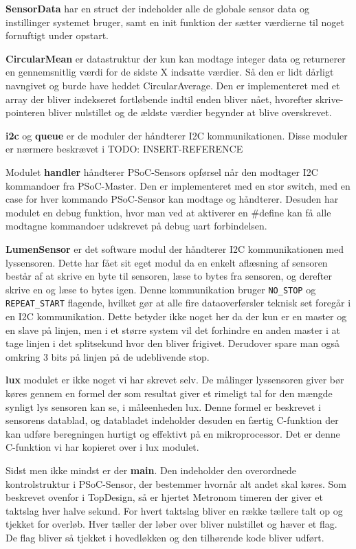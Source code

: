 \textbf{SensorData} har en struct der indeholder alle de globale sensor data og instillinger systemet bruger, samt en init funktion der sætter værdierne til noget fornuftigt under opstart.

\textbf{CircularMean} er datastruktur der kun kan modtage integer data og returnerer en gennemsnitlig værdi for de sidste X indsatte værdier. Så den er lidt dårligt navngivet og burde have heddet CircularAverage. Den er implementeret med et array der bliver indekseret fortløbende indtil enden bliver nået, hvorefter skrive-pointeren bliver nulstillet og de ældste værdier begynder at blive overskrevet.

\textbf{i2c} og \textbf{queue} er de moduler der håndterer I2C kommunikationen. Disse moduler er nærmere beskrævet i TODO: INSERT-REFERENCE

Modulet \textbf{handler} håndterer PSoC-Sensors opførsel når den modtager I2C kommandoer fra PSoC-Master. Den er implementeret med en stor switch, med en case for hver kommando PSoC-Sensor kan modtage og håndterer. Desuden har modulet en debug funktion, hvor man ved at aktiverer en \#define kan få alle modtagne kommandoer udskrevet på debug uart forbindelsen.

\textbf{LumenSensor} er det software modul der håndterer I2C kommunikationen med lyssensoren. Dette har fået sit eget modul da en enkelt aflæsning af sensoren består af at skrive en byte til sensoren, læse to bytes fra sensoren, og derefter skrive en og læse to bytes igen. Denne kommunikation bruger \texttt{NO\_STOP} og \texttt{REPEAT\_START} flagende, hvilket gør at alle fire dataoverførsler teknisk set foregår i en I2C kommunikation. Dette betyder ikke noget her da der kun er en master og en slave på linjen, men i et større system vil det forhindre en anden master i at tage linjen i det splitsekund hvor den bliver frigivet. Derudover spare man også omkring 3 bits på linjen på de udeblivende stop.

\textbf{lux} modulet er ikke noget vi har skrevet selv. De målinger lyssensoren giver bør køres gennem en formel der som resultat giver et rimeligt tal for den mængde synligt lys sensoren kan se, i måleenheden lux. Denne formel er beskrevet i sensorens datablad, og databladet indeholder desuden en færtig C-funktion der kan udføre beregningen hurtigt og effektivt på en mikroprocessor. Det er denne C-funktion vi har kopieret over i lux modulet.

Sidst men ikke mindst er der \textbf{main}. Den indeholder den overordnede kontrolstruktur i PSoC-Sensor, der bestemmer hvornår alt andet skal køres. Som beskrevet ovenfor i TopDesign, så er hjertet Metronom timeren der giver et taktslag hver halve sekund. For hvert taktslag bliver en række tællere talt op og tjekket for overløb. Hver tæller der løber over bliver nulstillet og hæver et flag. De flag bliver så tjekket i hovedløkken og den tilhørende kode bliver udført.

